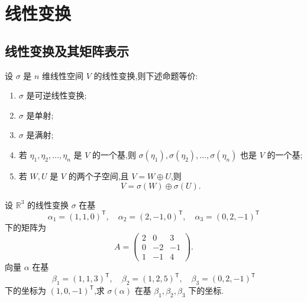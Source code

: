 \setcounter{chapter}{4}
\pagestyle{fancy}

\chapter{线性变换}

\section{线性变换及其矩阵表示}

\begin{theorem}[\markstar]
设 $\sigma$ 是 $n$ 维线性空间 $V$ 的线性变换,则下述命题等价:
\begin{enumerate}
    \item $\sigma$ 是可逆线性变换;
    \item $\sigma$ 是单射;
    \item $\sigma$ 是满射;
    \item 若 $\eta_1,\eta_2,\ldots,\eta_n$ 是 $V$ 的一个基,则
    $\sigma(\eta_1),\sigma(\eta_2),\ldots,\sigma(\eta_n)$ 也是 $V$ 的一个基;
    \item 若 $W,U$ 是 $V$ 的两个子空间,且 $V=W\oplus U$,则
    \[
        V=\sigma(W)\oplus\sigma(U).
    \]
\end{enumerate}
\end{theorem}

\begin{example}
设 $\mathbb{R}^3$ 的线性变换 $\sigma$ 在基
\[
\alpha_1=(1,1,0)^{\mathsf T},\quad
\alpha_2=(2,-1,0)^{\mathsf T},\quad
\alpha_3=(0,2,-1)^{\mathsf T}
\]
下的矩阵为
\[
A=
\begin{pmatrix}
2&0&3\\
0&-2&-1\\
1&-1&4
\end{pmatrix}.
\]
向量 $\alpha$ 在基
\[
\beta_1=(1,1,3)^{\mathsf T},\quad
\beta_2=(1,2,5)^{\mathsf T},\quad
\beta_3=(0,2,-1)^{\mathsf T}
\]
下的坐标为 $(1,0,-1)^{\mathsf T}$,求 $\sigma(\alpha)$ 在基
$\beta_1,\beta_2,\beta_3$ 下的坐标.
\end{example}
\exampleblank

